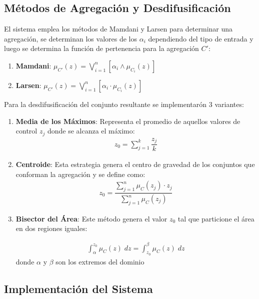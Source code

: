 \documentclass[a4paper,10pt,twocolumn]{article}
\begin{document}
\subsection*{M\'etodos de Agregaci\'on y Desdifusificaci\'on}

El sistema emplea los m\'etodos de Mamdani y Larsen para determinar una agregaci\'on, se determinan los valores de los $\alpha_i$ dependiendo del tipo de entrada y luego se determina la funci\'on de pertenencia para la agregaci\'on $C'$:
	\begin{enumerate}
		\item[] \textbf{Mamdani}: $\mu_{C'} (z) = \bigvee_{i=1}^{n} \left[ \alpha_i  \wedge \mu_{C_i} (z) \right]$ 
		
		\item[] \textbf{Larsen}: $\mu_{C'} (z) = \bigvee_{i=1}^{n} \left[ \alpha_i \cdot \mu_{C_i} (z) \right]$
	\end{enumerate}

Para la desdifusificaci\'on del conjunto resultante se implementar\'on 3 variantes:

	\begin{enumerate}
		\item[] \textbf{Media de los M\'aximos}: Representa el promedio de aquellos valores de control $z_j$ donde se alcanza el m\'aximo:
			\begin{align*}
				z_0 = \sum_{j=1}^{k} \dfrac{z_j}{k}
			\end{align*}
		
		\item[] \textbf{Centroide}: Esta estrategia genera el centro de gravedad de los conjuntos que conforman la agregaci\'on y se define como:
			\begin{align*}
				z_0 = \dfrac{\sum_{j=1}^{n} \mu_{C} (z_j) \cdot z_j}{\sum_{j=1}^{n} \mu_{C} (z_j)}
			\end{align*}
		
		\item[] \textbf{Bisector del \'Area}: Este m\'etodo genera el valor $z_0$ tal que particione el \'area en dos regiones iguales:
			
			\begin{align*}
				\int_{\alpha}^{z_0} \mu_C (z) \;dz = \int_{z_0}^{\beta} \mu_C (z) \;dz
			\end{align*}
		donde $\alpha$ y $\beta$ son los extremos del dominio	
		
	\end{enumerate}

\subsection*{Implementaci\'on del Sistema}
\end{document}
